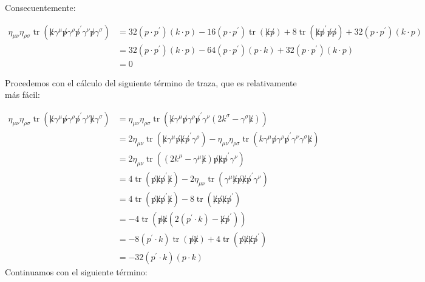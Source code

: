 Consecuentemente:

\begin{equation}
  \begin{aligned}
  \eta_{\mu \nu} \eta_{\rho \sigma} \operatorname{tr}\left(\not k \gamma^\mu \not p \gamma^\rho \not p^{\prime} \gamma^\nu \not p \gamma^\sigma\right) & =32\left(p \cdot p^{\prime}\right)(k \cdot p)-16\left(p \cdot p^{\prime}\right) \operatorname{tr}(\not k \not p)+8 \operatorname{tr}\left(\not k \not p^{\prime} \not p\not p \right)+32\left(p \cdot p^{\prime}\right)(k \cdot p) \\
  & =32\left(p \cdot p^{\prime}\right)(k \cdot p)-64\left(p \cdot p^{\prime}\right)(p \cdot k)+32\left(p \cdot p^{\prime}\right)(k \cdot p) \\
  & =0
  \end{aligned}
  \end{equation}

Procedemos con el cálculo del siguiente término de traza, que es relativamente más fácil:

\begin{equation}
  \begin{aligned}
   \eta_{\mu \nu} \eta_{\rho \sigma} \operatorname{tr}\left(\not k \gamma^\mu \not p \gamma^\rho \not p^{\prime} \gamma^\nu \not k \gamma^\sigma\right)&=\eta_{\mu \nu} \eta_{\rho \sigma} \operatorname{tr}\left(\not k \gamma^\mu \not p \gamma^\rho \not p^{\prime} \gamma^\nu\left(2 k^\sigma-\gamma^\sigma \not k\right)\right) \\
  & =2 \eta_{\mu \nu} \operatorname{tr}\left(\not k \gamma^\mu \not p \not k\not p^{\prime} \gamma^\rho\right)-\eta_{\mu \nu} \eta_{\rho \sigma} \operatorname{tr}\left(k \gamma^\mu \not p \gamma^\rho \not p^{\prime} \gamma^\nu \gamma^\sigma \not k\right) \\
  & =2 \eta_{\mu \nu} \operatorname{tr}\left(\left(2 k^\mu-\gamma^\mu \not k\right) \not p \not k \not p^{\prime} \gamma^\nu\right) \\
  & =4 \operatorname{tr}\left(\not p\not k \not p^{\prime} \not k\right)-2 \eta_{\mu \nu} \operatorname{tr}\left(\gamma^\mu \not k\not p \not k \not p^{\prime} \gamma^\nu\right) \\
  & =4 \operatorname{tr}\left(\not p\not k \not p^{\prime} \not k\right)-8 \operatorname{tr}\left(\not k\not p \not k \not p^{\prime}\right) \\
  & =-4 \operatorname{tr}\left(\not p\not k\left(2\left(p^{\prime} \cdot k\right)-\not k \not p^{\prime}\right)\right) \\
  & =-8\left(p^{\prime} \cdot k\right) \operatorname{tr}(\not p \not k)+4 \operatorname{tr}\left(\not p \not k \not k \not p^{\prime}\right) \\
  & =-32\left(p^{\prime} \cdot k\right)(p \cdot k)
  \end{aligned}
  \end{equation}
Continuamos con el siguiente término:

